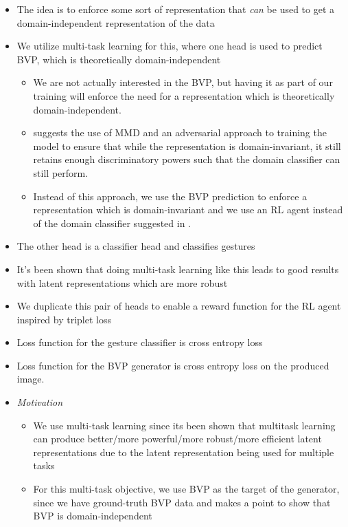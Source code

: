 \begin{itemize}
	\item The idea is to enforce some sort of representation that \textit{can} be used to get a domain-independent representation of the data
	\item We utilize multi-task learning for this, where one head is used to predict BVP, which is theoretically domain-independent \cite{zheng2019zero}
	\begin{itemize}
		\item We are not actually interested in the BVP, but having it as part of our training will enforce the need for a representation which is theoretically domain-independent.
		\item \cite{martini2021domain} suggests the use of MMD and an adversarial approach to training the model to ensure that while the representation is domain-invariant, it still retains enough discriminatory powers such that the domain classifier can still perform.
		\item Instead of this approach, we use the BVP prediction to enforce a representation which is domain-invariant and we use an RL agent instead of the domain classifier suggested in \cite{martini2021domain}.
	\end{itemize}
	\item The other head is a classifier head and classifies gestures
	\item It's been shown that doing multi-task learning like this leads to good results with latent representations which are more robust \cite{tuggener2021deepscoresv2}
	\item We duplicate this pair of heads to enable a reward function for the RL agent inspired by triplet loss
	\item Loss function for the gesture classifier is cross entropy loss
	\item Loss function for the BVP generator is cross entropy loss on the produced image.
	\item \emph{Motivation}
	\begin{itemize}
		\item We use multi-task learning since its been shown that multitask learning can produce better/more powerful/more robust/more efficient latent representations due to the latent representation being used for multiple tasks
		\item For this multi-task objective, we use BVP as the target of the generator, since we have ground-truth BVP data and \cite{zheng2019zero} makes a point to show that BVP is domain-independent

\end{itemize}
\end{itemize}
